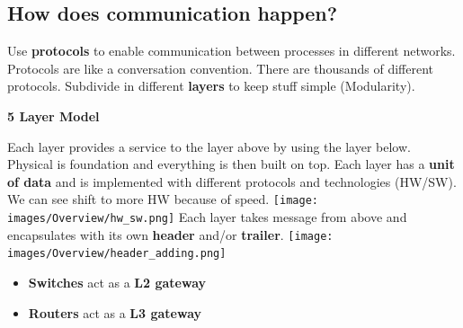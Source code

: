 \documentclass[a4paper, fontsize=8pt, landscape, DIV=1]{scrartcl}
\begin{document}
\begin{multicols*}{4}
		\subsection{How does communication happen?}
		Use \textbf{protocols} to enable communication between processes in
		different networks. Protocols are like a conversation convention. There are
		thousands of different protocols. Subdivide in different \textbf{layers} to keep
		stuff simple (Modularity).
		\begin{center}
			\textbf{5 Layer Model}\\
		\end{center}
		\par 
		Each layer provides a service to the layer above by using the layer below.
		Physical is foundation and everything is then built on top. 
		Each layer has a \textbf{unit of data} and is implemented with different
		protocols and technologies (HW/SW). We can see shift to more HW because of
		speed. 
		\texttt{[image: images/Overview/hw\_sw.png]}
		Each layer takes message from above and encapsulates with its own
		\textbf{header} and/or \textbf{trailer}. 
		\texttt{[image: images/Overview/header\_adding.png]}
		\begin{itemize}[noitemsep]
			\item \textbf{Switches} act as a \textbf{L2 gateway}
			\item \textbf{Routers} act as a \textbf{L3 gateway}
		\end{itemize}
		

\end{multicols*}
\end{document}
